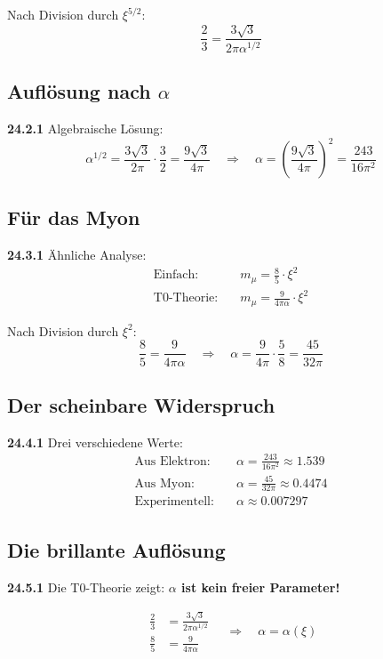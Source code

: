 \documentclass[12pt,a4paper]{article}
\begin{document}
Nach Division durch $\xi^{5/2}$:
\[
\frac{2}{3} = \frac{3\sqrt{3}}{2\pi\alpha^{1/2}}
\]

\subsection{Auflösung nach $\alpha$}

\noindent \textbf{24.2.1} Algebraische Lösung:
\[
\alpha^{1/2} = \frac{3\sqrt{3}}{2\pi} \cdot \frac{3}{2} = \frac{9\sqrt{3}}{4\pi}
\quad \Rightarrow \quad
\alpha = \left(\frac{9\sqrt{3}}{4\pi}\right)^2 = \frac{243}{16\pi^2}
\]

\subsection{Für das Myon}

\noindent \textbf{24.3.1} Ähnliche Analyse:
\begin{align*}
	\text{Einfach:} &\quad m_\mu = \frac{8}{5} \cdot \xi^2 \\
	\text{T0-Theorie:} &\quad m_\mu = \frac{9}{4\pi\alpha} \cdot \xi^2
\end{align*}

Nach Division durch $\xi^2$:
\[
\frac{8}{5} = \frac{9}{4\pi\alpha}
\quad \Rightarrow \quad
\alpha = \frac{9}{4\pi} \cdot \frac{5}{8} = \frac{45}{32\pi}
\]

\subsection{Der scheinbare Widerspruch}

\noindent \textbf{24.4.1} Drei verschiedene Werte:
\begin{align*}
	\text{Aus Elektron:} &\quad \alpha = \frac{243}{16\pi^2} \approx 1.539 \\
	\text{Aus Myon:} &\quad \alpha = \frac{45}{32\pi} \approx 0.4474 \\
	\text{Experimentell:} &\quad \alpha \approx 0.007297
\end{align*}

\subsection{Die brillante Auflösung}

\noindent \textbf{24.5.1} Die T0-Theorie zeigt: \textbf{$\alpha$ ist kein freier Parameter!}

\[
\boxed{
	\begin{aligned}
		\frac{2}{3} &= \frac{3\sqrt{3}}{2\pi\alpha^{1/2}} \\
		\frac{8}{5} &= \frac{9}{4\pi\alpha}
	\end{aligned}
	\quad \Rightarrow \quad
	\alpha = \alpha(\xi)
}
\]
\end{document}
